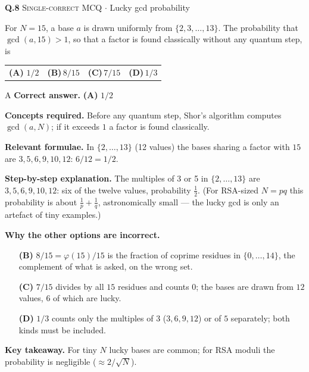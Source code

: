 \documentclass[11pt,a4paper]{article}
\newcommand{\optlabel}[1]{\textbf{(#1)}}
\newcommand{\correctlabel}[1]{\textcolor{okgreen}{\textbf{(#1)}\,\ding{51}}}
\newenvironment{qitem}[1]{\begin{list}{}{\setlength{\leftmargin}{3.3em}\setlength{\labelwidth}{3.1em}%
  \setlength{\labelsep}{0.2em}\setlength{\topsep}{3pt}\setlength{\parsep}{3pt}}\item[\textbf{Q.#1}\hfill]}{\end{list}}
\newcommand{\qsep}{\par\vspace{2pt}{\color{black!15}\hrule}\vspace{4pt}}
\newcommand{\qmeta}[2]{{\footnotesize\color{black!60}\textsc{#1} \;$\cdot$\; #2}\par}
\begin{document}
\begin{qitem}{8}
\qmeta{Single-correct MCQ}{Lucky gcd probability}
For $N = 15$, a base $a$ is drawn uniformly from $\{2, 3, \dots, 13\}$. The probability that $\gcd(a, 15) > 1$, so that a factor is found classically
without any quantum step, is
\par\smallskip\noindent\begin{tabularx}{\linewidth}{@{}*{4}{L}@{}}
\correctlabel{A}\,$1/2$ & \optlabel{B}\,$8/15$ & \optlabel{C}\,$7/15$ & \optlabel{D}\,$1/3$
\end{tabularx}
\end{qitem}
\begin{solbox}{A}
\textbf{\color{brand}Correct answer.} \textcolor{okgreen}{\textbf{(A)}} $1/2$

\textbf{\color{brand}Concepts required.} Before any quantum step, Shor's algorithm computes $\gcd(a, N)$; if it exceeds $1$ a factor is found classically.

\textbf{\color{brand}Relevant formulae.} In $\{2, \dots, 13\}$ (12 values) the bases sharing a factor with $15$ are $3, 5, 6, 9, 10, 12$: $6/12 = 1/2$.

\textbf{\color{brand}Step-by-step explanation.} The multiples of 3 or 5 in $\{2, \dots, 13\}$ are $3, 5, 6, 9, 10, 12$: six of the twelve values, probability $\frac12$. (For RSA-sized $N = pq$ this
probability is about $\frac1p + \frac1q$, astronomically small --- the lucky gcd is only an artefact of tiny examples.)

\textbf{\color{brand}Why the other options are incorrect.}
\begin{itemize}[leftmargin=2.4em, itemsep=1pt, topsep=2pt]
\item[\textbf{(B)}] $8/15 = \varphi(15)/15$ is the fraction of coprime residues in $\{0, \dots, 14\}$, the complement of what is asked, on the wrong set.
\item[\textbf{(C)}] $7/15$ divides by all $15$ residues and counts $0$; the bases are drawn from $12$ values, $6$ of which are lucky.
\item[\textbf{(D)}] $1/3$ counts only the multiples of $3$ ($3, 6, 9, 12$) or of $5$ separately; both kinds must be included.
\end{itemize}
\textbf{\color{brand}Key takeaway.} For tiny $N$ lucky bases are common; for RSA moduli the probability is negligible ($\approx 2/\sqrt N$).
\end{solbox}
\qsep
\end{document}
